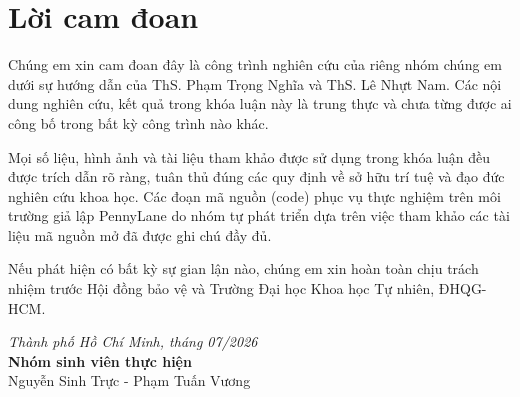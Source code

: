 \chapter*{Lời cam đoan}
\label{reassurances}

Chúng em xin cam đoan đây là công trình nghiên cứu của riêng nhóm chúng em dưới sự hướng dẫn của ThS. Phạm Trọng Nghĩa và ThS. Lê Nhựt Nam. Các nội dung nghiên cứu, kết quả trong khóa luận này là trung thực và chưa từng được ai công bố trong bất kỳ công trình nào khác. 

Mọi số liệu, hình ảnh và tài liệu tham khảo được sử dụng trong khóa luận đều được trích dẫn rõ ràng, tuân thủ đúng các quy định về sở hữu trí tuệ và đạo đức nghiên cứu khoa học. Các đoạn mã nguồn (code) phục vụ thực nghiệm trên môi trường giả lập PennyLane do nhóm tự phát triển dựa trên việc tham khảo các tài liệu mã nguồn mở đã được ghi chú đầy đủ.

Nếu phát hiện có bất kỳ sự gian lận nào, chúng em xin hoàn toàn chịu trách nhiệm trước Hội đồng bảo vệ và Trường Đại học Khoa học Tự nhiên, ĐHQG-HCM.

\vspace{1cm}
\begin{flushright}
\textit{Thành phố Hồ Chí Minh, tháng 07/2026}\\
\textbf{Nhóm sinh viên thực hiện}\\
Nguyễn Sinh Trực - Phạm Tuấn Vương
\end{flushright}